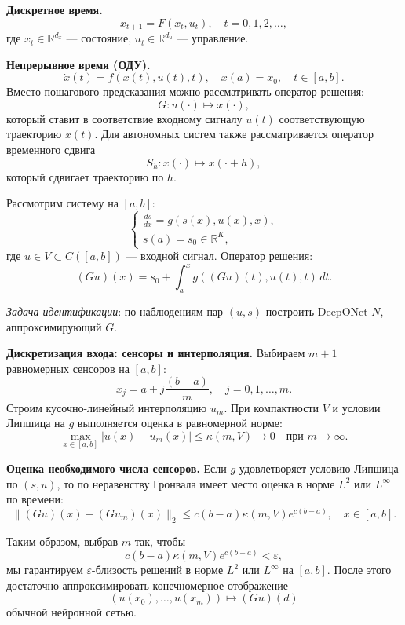 \documentclass[../NDCNNAI_main.tex]{subfiles}
\begin{document}
\textbf{Дискретное время.}
\[
x_{t+1} = F(x_t, u_t), \quad t = 0, 1, 2, \dots,
\]
где \( x_t \in \mathbb{R}^{d_x} \) --- состояние, \( u_t \in \mathbb{R}^{d_u} \) --- управление.

\textbf{Непрерывное время (ОДУ).}
\[
\dot{x}(t) = f(x(t), u(t), t), \quad x(a) = x_0, \quad t \in [a, b].
\]
Вместо пошагового предсказания можно рассматривать оператор решения:
\[
G \colon u(\cdot) \longmapsto x(\cdot),
\]
который ставит в соответствие входному сигналу \( u(t) \) соответствующую траекторию \( x(t) \).
Для автономных систем также рассматривается оператор временного сдвига
\[
S_h \colon x(\cdot) \longmapsto x(\cdot + h),
\]
который сдвигает траекторию по $h$.

\begin{example}
Рассмотрим систему на \([a, b]\):
\[
\begin{cases} 
\frac{ds}{dx} = g(s(x), u(x), x), \\
s(a) = s_0 \in \mathbb{R}^K,
\end{cases}
\]
где \( u \in V \subset C([a, b]) \) --- входной сигнал. Оператор решения:
\[
(Gu)(x) = s_0 + \int_a^x g((Gu)(t), u(t), t) \, dt.
\]

\emph{Задача идентификации}: по наблюдениям пар \( (u, s) \) построить DeepONet \( N \), аппроксимирующий \( G \).

\textbf{Дискретизация входа: сенсоры и интерполяция.}
Выбираем \( m+1 \) равномерных сенсоров на \([a, b]\):
\[
x_j = a + j \frac{(b - a)}{m}, \quad j = 0, 1, \dots, m.
\]
Строим кусочно-линейный интерполяцию \( u_m \). При компактности \( V \) и условии Липшица на \( g \) выполняется оценка в равномерной норме:
\[
\max_{x \in [a, b]} |u(x) - u_m(x)| \leq \kappa(m, V) \to 0 \quad \text{при } m \to \infty.
\]

\textbf{Оценка необходимого числа сенсоров.}
Если \( g \) удовлетворяет условию Липшица по \( (s, u) \), то по неравенству Гронвала имеет место оценка в норме $L^2$ или $L^{\infty}$ по времени:
\[
\|(Gu)(x) - (Gu_m)(x)\|_2 \leq c(b - a) \kappa(m, V) e^{c(b - a)}, \quad x \in [a, b].
\]

Таким образом, выбрав \( m \) так, чтобы 
\[
c(b - a) \kappa(m, V) e^{c(b - a)} < \varepsilon,
\]
мы гарантируем \( \varepsilon \)-близость решений в норме $L^2$ или $L^{\infty}$ на $[a, b]$. После этого достаточно аппроксимировать конечномерное отображение
\[
(u(x_0), \dots, u(x_m)) \mapsto (Gu)(d)
\]
обычной нейронной сетью.
\end{example}
\end{document}
